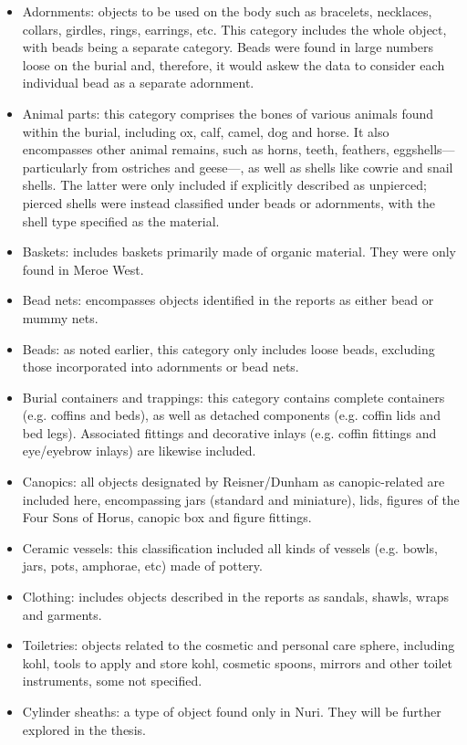 \begin{itemize}
	\item Adornments: objects to be used on the body such as bracelets, necklaces, collars, girdles, rings, earrings, etc. This category includes the whole object, with beads being a separate category. Beads were found in large numbers loose on the burial and, therefore, it would askew the data to consider each individual bead as a separate adornment. 
	\item Animal parts: this category comprises the bones of various animals found within the burial, including ox, calf, camel, dog and horse. It also encompasses other animal remains, such as horns, teeth, feathers, eggshells—particularly from ostriches and geese—, as well as shells like cowrie and snail shells. The latter were only included if explicitly described as unpierced; pierced shells were instead classified under beads or adornments, with the shell type specified as the material.
	\item Baskets: includes baskets primarily made of organic material. They were only found in Meroe West.
	\item Bead nets: encompasses objects identified in the reports as either bead or mummy nets.
	\item Beads: as noted earlier, this category only includes loose beads, excluding those incorporated into adornments or bead nets.
	\item Burial containers and trappings: this category contains complete containers (e.g. coffins and beds), as well as detached components (e.g. coffin lids and bed legs). Associated fittings and decorative inlays (e.g. coffin fittings and eye/eyebrow inlays) are likewise included.
	\item Canopics: all objects designated by Reisner/Dunham as canopic-related are included here, encompassing jars (standard and miniature), lids, figures of the Four Sons of Horus, canopic box and figure fittings.
	\item Ceramic vessels: this classification included all kinds of vessels (e.g. bowls, jars, pots, amphorae, etc) made of pottery.
	\item Clothing: includes objects described in the reports as sandals, shawls, wraps and garments.
	\item Toiletries: objects related to the cosmetic and personal care sphere, including kohl, tools to apply and store kohl, cosmetic spoons, mirrors and other toilet instruments, some not specified.
	\item Cylinder sheaths: a type of object found only in Nuri. They will be further explored in the thesis.

\end{itemize}
